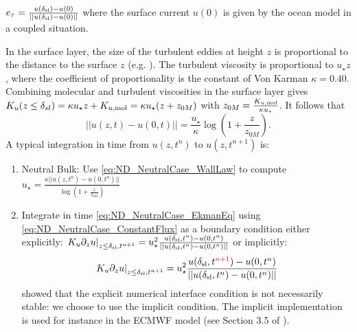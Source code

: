 $e_\tau = \frac{u(\delta_{\rm sl})-u(0)}
	{||u(\delta_{\rm sl})-u(0)||}$
where the surface current $u(0)$ is given by the ocean model
in a coupled situation.
%
\par
In the surface layer, the size of the turbulent eddies at height $z$
is proportional to the distance to the surface $z$
(e.g. \cite{kawai_wall-modeling_2012}). The turbulent viscosity
is proportional to $u_\star z$, where the coefficient of
proportionality is the constant of Von Karman $\kappa = 0.40$.
Combining molecular and turbulent viscosities in the surface layer
gives $K_u(z\leq \delta_{sl}) = \kappa u_\star z + K_{u, {\rm mol}}
= \kappa u_\star (z + z_{0M})$ with $z_{0M} = \frac{K_{u, {\rm mol}}}{\kappa u_\star}$.
It follows that
\begin{equation}
\label{eq:ND_NeutralCase_WallLaw}
	||u(z, t) - u(0, t)|| = \frac{{u_\star}}{\kappa}
	\log(1+\frac{z}{z_{0M}}).
\end{equation}
A typical integration in time from $u(z, t^{n})$ to
$u(z, t^{n+1})$ is:
\begin{enumerate}
	\item Neutral Bulk: Use \eqref{eq:ND_NeutralCase_WallLaw}
	  to compute $u_\star = \frac{\kappa ||u(z, t^n)-u(0, t^n)||}
			{\log(1+\frac{z}{z_{0M}})}$
  \item Integrate in time \eqref{eq:ND_NeutralCase_EkmanEq}
  using \eqref{eq:ND_NeutralCase_ConstantFlux} as a boundary condition
		either explicitly: $\left.K_u \partial_z u
		\right|_{z\leq \delta_{\rm sl}, t^{n+1}}
		= u_\star^2 \frac{u(\delta_{\rm sl}, t^n)-u(0,t^n)}
		{||u(\delta_{\rm sl}, t^n)-u(0,t^n)||}$
		or implicitly:
	\begin{equation}
		\left.K_u \partial_z u
		\right|_{z\leq \delta_{\rm sl}, t^{n+1}}
		= u_\star^2 \frac{u(\delta_{\rm sl},
		t^{\color{red} n+1})-u(0,t^n)}
		{||u(\delta_{\rm sl}, t^n)-u(0,t^n)||}
	\end{equation}
	\cite{lemarie_stability_2015} showed that the explicit
	numerical interface condition is not necessarily
	stable: we choose to use the implicit condition.
	The implicit implementation is used for instance in the
	ECMWF model (see Section 3.5 of \citep{ecmwf_ifs_2020}).
\end{enumerate}

